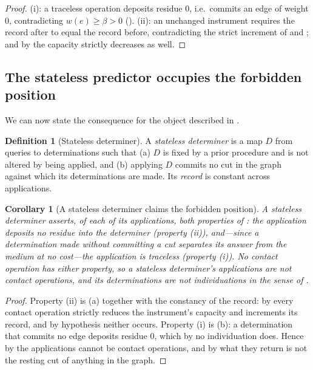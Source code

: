 \documentclass[11pt,twocolumn,a4paper]{article}
\theoremstyle{dirthm}
\newtheorem{corollary}[theorem]{Corollary}
\theoremstyle{definition}
\newtheorem{definition}[theorem]{Definition}
\theoremstyle{remark}
\newcommand{\wt}{w}
\newcommand{\flo}{\beta}
\begin{document}
\begin{proof}
(i): a traceless operation deposits residue $0$, i.e.\ commits an edge of
weight $0$, contradicting $\wt(e)\ge\flo>0$ (). (ii): an
unchanged instrument requires the record after to equal the record before,
contradicting the strict increment of  and
; and by  the capacity strictly decreases
as well.
\end{proof}

\subsection{The stateless predictor occupies the forbidden position}
\label{sec:stateless}

We can now state the consequence for the object described in
.

\begin{definition}[Stateless determiner]
\label{def:stateless}
A \emph{stateless determiner} is a map $D$ from queries to determinations
such that (a) $D$ is fixed by a prior procedure and is not altered by being
applied, and (b) applying $D$ commits no cut in the graph against which its
determinations are made. Its \emph{record} is constant across applications.
\end{definition}

\begin{corollary}[A stateless determiner claims the forbidden position]
\label{cor:stateless-forbidden}
A stateless determiner asserts, of each of its applications, both properties
of : the application deposits no residue into the
determiner (property (ii)), and---since a determination made without
committing a cut separates its answer from the medium at no cost---the
application is traceless (property (i)). No contact operation has either
property, so a stateless determiner's applications are not contact
operations, and its determinations are not individuations in the sense of
.
\end{corollary}

\begin{proof}
Property (ii) is (a) together with the constancy of the
record: by  every contact operation strictly reduces the
instrument's capacity and increments its record, and by hypothesis neither
occurs. Property (i) is (b): a determination that commits
no edge deposits residue $0$, which by  no individuation
does. Hence by  the applications cannot be contact
operations, and by  what they return is not the resting cut
of anything in the graph.
\end{proof}
\end{document}

